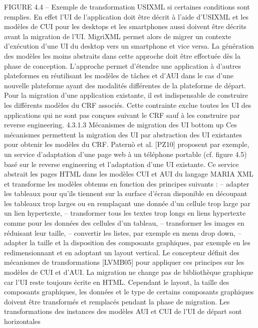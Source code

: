 \documentclass{article}
\begin{document}
 
 
FIGURE 4.4 – Exemple de transformation USIXML
si certaines conditions sont remplies. En effet l’UI de l’application doit \^{e}tre d\'{e}crit \`{a} l’aide d’USIXML
et les mod\`{e}les de CUI pour les desktops et les smartphones aussi doivent \^{e}tre d\'{e}crits avant la migration de l’UI. MigriXML permet alors de migrer un contexte d’ex\'{e}cution d’une UI du desktop vers un
smartphone et vice versa.
La g\'{e}n\'{e}ration des mod\`{e}les les moins abstraits dans cette approche doit \^{e}tre effectu\'{e}e d\`{e}s la phase
de conception. L’approche permet d’\'{e}tendre une application \`{a} d’autres plateformes en r\'{e}utilisant les
mod\`{e}les de t\^{a}ches et d’AUI dans le cas d’une nouvelle plateforme ayant des modalit\'{e}s diff\'{e}rentes de la
plateforme de d\'{e}part. Pour la migration d’une application existante, il est indispensable de construire
les diff\'{e}rents mod\`{e}les du CRF associ\'{e}s. Cette contrainte exclue toutes les UI des applications qui ne
sont pas con\c{c}ues suivant le CRF sauf \`{a} les construire par reverse engineering.
4.3.1.3
M\'{e}canismes de migration des UI bottom up
Ces m\'{e}canismes permettent la migration des UI par abstraction des UI existantes pour obtenir les
mod\`{e}les du CRF. Paternò et al. [PZ10] proposent par exemple, un service d’adaptation d’une page
web \`{a} un t\'{e}l\'{e}phone portable (cf. ﬁgure 4.5) bas\'{e} sur le reverse engineering et l’adaptation d’une UI
existante. Ce service abstrait les pages HTML dans les mod\`{e}les CUI et AUI du langage MARIA XML
et transforme les mod\`{e}les obtenus en fonction des principes suivants :
– adapter les tableaux pour qu’ils tiennent sur la surface d’\'{e}cran disponible en d\'{e}coupant les
tableaux trop larges ou en rempla\c{c}ant une donn\'{e}e d’un cellule trop large par un lien hypertexte,
– transformer tous les textes trop longs en liens hypertexte comme pour les donn\'{e}es des cellules
d’un tableau,
– transformer les images en r\'{e}duisant leur taille,
– convertir les listes, par exemple en menu drop down,
– adapter la taille et la disposition des composants graphiques, par exemple en les redimensionnant et en adoptant un layout vertical.
Le concepteur d\'{e}ﬁnit des m\'{e}canismes de transformations [LVMB05] pour appliquer ces principes
sur les mod\`{e}les de CUI et d’AUI. La migration ne change pas de biblioth\`{e}que graphique car l’UI reste
toujours \'{e}crite en HTML. Cependant le layout, la taille des composants graphiques, les donn\'{e}es et le
type de certains composants graphiques doivent \^{e}tre transform\'{e}s et remplac\'{e}s pendant la phase de migration. Les transformations des instances des mod\`{e}les AUI et CUI de l’UI de d\'{e}part sont horizontales
\end{document}
